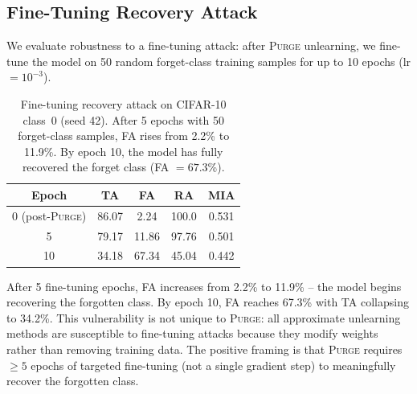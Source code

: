 \documentclass{article}
\newcommand{\ours}{\textsc{Purge}}
\newcommand{\newpar}[1]{{\color{orange}#1}}
\begin{document}
\newpar{
\subsection{Fine-Tuning Recovery Attack}\label{sec:finetune_recovery}

We evaluate robustness to a fine-tuning attack: after \ours{} unlearning, we fine-tune the model on 50 random forget-class training samples for up to 10 epochs (lr $= 10^{-3}$).

\begin{table}[t]
\centering
\small
\begin{tabular}{ccccc}
\toprule
Epoch & TA & FA & RA & MIA \\
\midrule
0 (post-\ours{}) & 86.07 & 2.24 & 100.0 & 0.531 \\
5 & 79.17 & 11.86 & 97.76 & 0.501 \\
10 & 34.18 & 67.34 & 45.04 & 0.442 \\
\bottomrule
\end{tabular}
\caption{Fine-tuning recovery attack on CIFAR-10 class~0 (seed 42). After 5 epochs with 50 forget-class samples, FA rises from 2.2\% to 11.9\%. By epoch 10, the model has fully recovered the forget class (FA $= 67.3$\%).}
\label{tab:finetune_recovery}
\end{table}

After 5 fine-tuning epochs, FA increases from 2.2\% to 11.9\% -- the model begins recovering the forgotten class. By epoch 10, FA reaches 67.3\% with TA collapsing to 34.2\%. This vulnerability is not unique to \ours{}: all approximate unlearning methods are susceptible to fine-tuning attacks because they modify weights rather than removing training data. The positive framing is that \ours{} requires $\ge 5$ epochs of targeted fine-tuning (not a single gradient step) to meaningfully recover the forgotten class.
}
\end{document}
